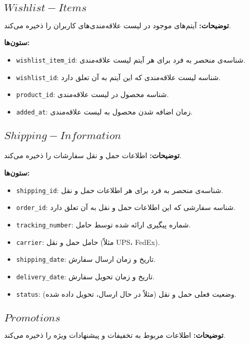 \documentclass[12pt]{article}
\begin{document}
\subsection{\(Wishlist-Items\)}

\textbf{توضیحات:} آیتم‌های موجود در لیست علاقه‌مندی‌های کاربران را ذخیره می‌کند.

\textbf{ستون‌ها:}
\begin{itemize}
    \item \texttt{wishlist\_item\_id}: شناسه‌ی منحصر به فرد برای هر آیتم لیست علاقه‌مندی.
    \item \texttt{wishlist\_id}: شناسه لیست علاقه‌مندی که این آیتم به آن تعلق دارد.
    \item \texttt{product\_id}: شناسه محصول در لیست علاقه‌مندی.
    \item \texttt{added\_at}: زمان اضافه شدن محصول به لیست علاقه‌مندی.
\end{itemize}

\subsection{\(Shipping-Information\)}

\textbf{توضیحات:} اطلاعات حمل و نقل سفارشات را ذخیره می‌کند.

\textbf{ستون‌ها:}
\begin{itemize}
    \item \texttt{shipping\_id}: شناسه‌ی منحصر به فرد برای هر اطلاعات حمل و نقل.
    \item \texttt{order\_id}: شناسه سفارشی که این اطلاعات حمل و نقل به آن تعلق دارد.
    \item \texttt{tracking\_number}: شماره پیگیری ارائه شده توسط حامل.
    \item \texttt{carrier}: حامل حمل و نقل (مثلاً UPS، FedEx).
    \item \texttt{shipping\_date}: تاریخ و زمان ارسال سفارش.
    \item \texttt{delivery\_date}: تاریخ و زمان تحویل سفارش.
    \item \texttt{status}: وضعیت فعلی حمل و نقل (مثلاً در حال ارسال، تحویل داده شده).
\end{itemize}

\subsection{\(Promotions\)}

\textbf{توضیحات:} اطلاعات مربوط به تخفیفات و پیشنهادات ویژه را ذخیره می‌کند.
\end{document}
